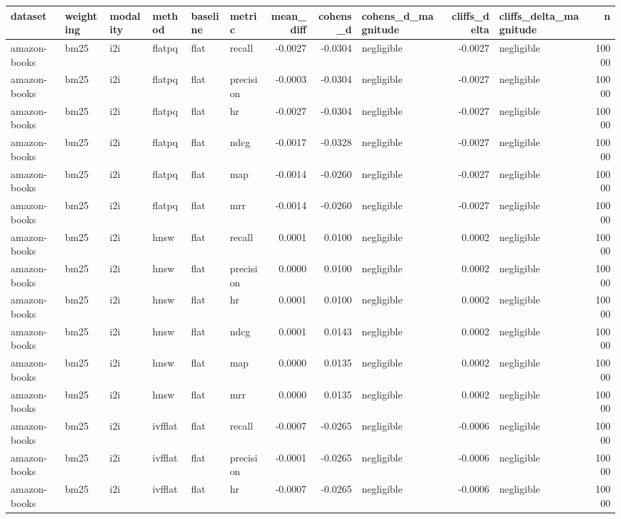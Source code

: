 \begin{tabular}{llllllrrlrlr}
\toprule
dataset & weighting & modality & method & baseline & metric & mean_diff & cohens_d & cohens_d_magnitude & cliffs_delta & cliffs_delta_magnitude & n \\
\midrule
amazon-books & bm25 & i2i & flatpq & flat & recall & -0.0027 & -0.0304 & negligible & -0.0027 & negligible & 10000 \\
amazon-books & bm25 & i2i & flatpq & flat & precision & -0.0003 & -0.0304 & negligible & -0.0027 & negligible & 10000 \\
amazon-books & bm25 & i2i & flatpq & flat & hr & -0.0027 & -0.0304 & negligible & -0.0027 & negligible & 10000 \\
amazon-books & bm25 & i2i & flatpq & flat & ndcg & -0.0017 & -0.0328 & negligible & -0.0027 & negligible & 10000 \\
amazon-books & bm25 & i2i & flatpq & flat & map & -0.0014 & -0.0260 & negligible & -0.0027 & negligible & 10000 \\
amazon-books & bm25 & i2i & flatpq & flat & mrr & -0.0014 & -0.0260 & negligible & -0.0027 & negligible & 10000 \\
amazon-books & bm25 & i2i & hnsw & flat & recall & 0.0001 & 0.0100 & negligible & 0.0002 & negligible & 10000 \\
amazon-books & bm25 & i2i & hnsw & flat & precision & 0.0000 & 0.0100 & negligible & 0.0002 & negligible & 10000 \\
amazon-books & bm25 & i2i & hnsw & flat & hr & 0.0001 & 0.0100 & negligible & 0.0002 & negligible & 10000 \\
amazon-books & bm25 & i2i & hnsw & flat & ndcg & 0.0001 & 0.0143 & negligible & 0.0002 & negligible & 10000 \\
amazon-books & bm25 & i2i & hnsw & flat & map & 0.0000 & 0.0135 & negligible & 0.0002 & negligible & 10000 \\
amazon-books & bm25 & i2i & hnsw & flat & mrr & 0.0000 & 0.0135 & negligible & 0.0002 & negligible & 10000 \\
amazon-books & bm25 & i2i & ivfflat & flat & recall & -0.0007 & -0.0265 & negligible & -0.0006 & negligible & 10000 \\
amazon-books & bm25 & i2i & ivfflat & flat & precision & -0.0001 & -0.0265 & negligible & -0.0006 & negligible & 10000 \\
amazon-books & bm25 & i2i & ivfflat & flat & hr & -0.0007 & -0.0265 & negligible & -0.0006 & negligible & 10000 \\

\end{tabular}
